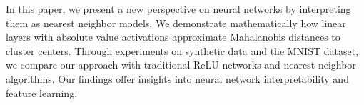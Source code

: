 
In this paper, we present a new perspective on neural networks by interpreting them as nearest neighbor models. We demonstrate mathematically how linear layers with absolute value activations approximate Mahalanobis distances to cluster centers. Through experiments on synthetic data and the MNIST dataset, we compare our approach with traditional ReLU networks and nearest neighbor algorithms. Our findings offer insights into neural network interpretability and feature learning.

